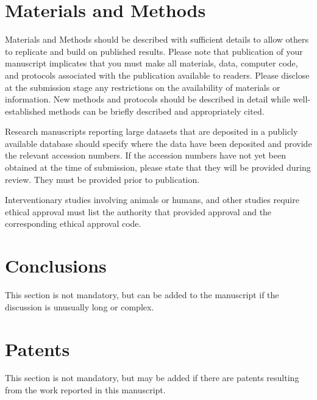 \documentclass[jdss,article,submit,moreauthors,pdftex]{Definitions/jdss}
\begin{document}
\section{Materials and Methods}

Materials and Methods should be described with sufficient details to allow others to replicate and build on published results. Please note that publication of your manuscript implicates that you must make all materials, data, computer code, and protocols associated with the publication available to readers. Please disclose at the submission stage any restrictions on the availability of materials or information. New methods and protocols should be described in detail while well-established methods can be briefly described and appropriately cited.

Research manuscripts reporting large datasets that are deposited in a publicly available database should specify where the data have been deposited and provide the relevant accession numbers. If the accession numbers have not yet been obtained at the time of submission, please state that they will be provided during review. They must be provided prior to publication.

Interventionary studies involving animals or humans, and other studies require ethical approval must list the authority that provided approval and the corresponding ethical approval code. 

\section{Conclusions}

This section is not mandatory, but can be added to the manuscript if the discussion is unusually long or complex.

\section{Patents}

This section is not mandatory, but may be added if there are patents resulting from the work reported in this manuscript.

\vspace{6pt} 

\end{document}
